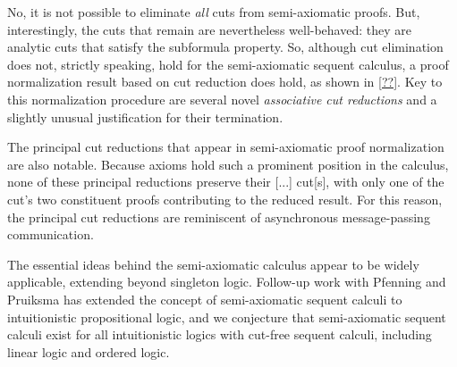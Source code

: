 No, it is not possible to eliminate \emph{all} cuts from semi-axiomatic proofs.
But, interestingly, the cuts that remain are nevertheless well-behaved: they are analytic cuts that satisfy the subformula property.
So, although cut elimination does not, strictly speaking, hold for the semi-axiomatic sequent calculus, a proof normalization result based on cut reduction does hold, as shown in \cref{??}.
Key to this normalization procedure are several novel \emph{associative cut reductions} and a slightly unusual justification for their termination.

The principal cut reductions that appear in semi-axiomatic proof normalization are also notable.
Because axioms hold such a prominent position in the calculus, none of these principal reductions preserve their [...] cut[s], with only one of the cut's two constituent proofs contributing to the reduced result.
For this reason, the principal cut reductions are reminiscent of asynchronous message-passing communication.

The essential ideas behind the semi-axiomatic calculus appear to be widely applicable, extending beyond singleton logic.
Follow-up work with Pfenning and Pruiksma has extended the concept of semi-axiomatic sequent calculi to intuitionistic propositional logic\autocite{DeYoung+:FSCD20}, and we conjecture that semi-axiomatic sequent calculi exist for all intuitionistic logics with cut-free sequent calculi, including linear logic and ordered logic.










